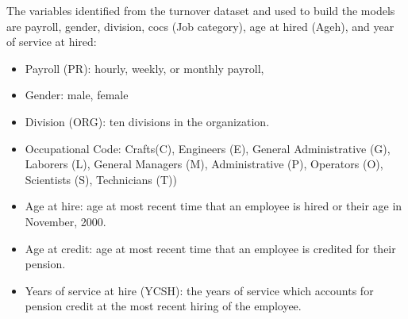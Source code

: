 \documentclass[12pt,letterpaper]{article}
\begin{document}
The variables identified from the turnover dataset and used to build the models are payroll, gender, division, cocs (Job category), age at hired (Ageh),  and year of service at hired:
\begin{itemize}
	\item Payroll (PR): hourly, weekly, or monthly payroll,
	\item Gender: male, female
	\item Division (ORG): ten divisions in the organization.
	\item Occupational Code: Crafts(C), Engineers (E), General Administrative (G), Laborers (L), General Managers (M),  Administrative (P),  Operators (O), Scientists (S), Technicians (T))
	\item Age at hire: age at most recent time that an employee is hired or their age in November, 2000.
	\item Age at credit: age at most recent time that an employee is credited for their pension.
	\item Years of service at hire (YCSH): the years of service which accounts for pension credit at the most recent hiring of the employee.
	
\end{itemize}
\end{document}
